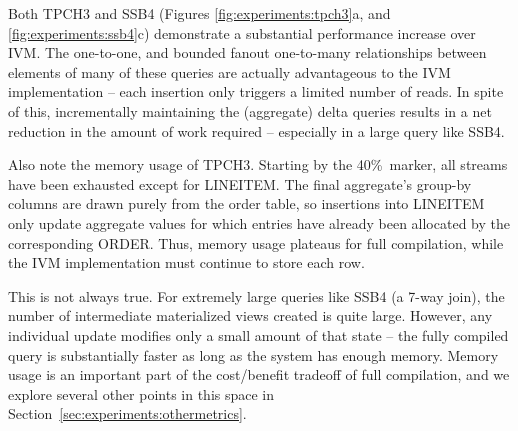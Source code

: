 Both TPCH3 and SSB4 (Figures \ref{fig:experiments:tpch3}a, and \ref{fig:experiments:ssb4}c) demonstrate a substantial performance increase over IVM.  The one-to-one, and bounded fanout one-to-many relationships between elements of many of these queries are actually advantageous to the IVM implementation -- each insertion only triggers a limited number of reads.  In spite of this, incrementally maintaining the (aggregate) delta queries results in a net reduction in the amount of work required -- especially in a large query like SSB4.

Also note the memory usage of TPCH3.  Starting by the 40\%\ marker, all streams have been exhausted except for LINEITEM.  The final aggregate's group-by columns are drawn purely from the order table, so insertions into LINEITEM only update aggregate values for which entries have already been allocated by the corresponding ORDER.  Thus, memory usage plateaus for full compilation, while the IVM implementation must continue to store each row.

This is not always true.  For extremely large queries like SSB4 (a 7-way join), the number of intermediate materialized views created is quite large.  However, any individual update modifies only a small amount of that state -- the fully compiled query is substantially faster as long as the system has enough memory.  Memory usage is an important part of the cost/benefit tradeoff of full compilation, and we explore several other points in this space in Section~\ref{sec:experiments:othermetrics}.

